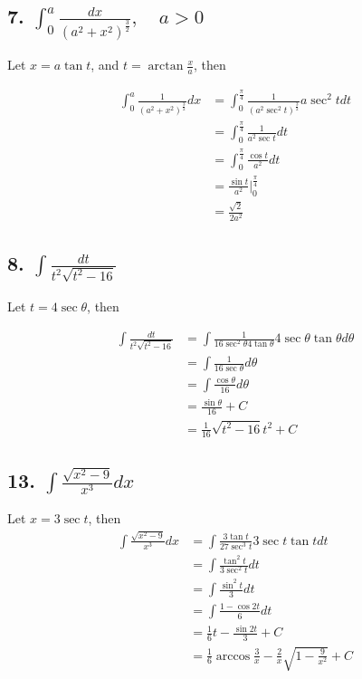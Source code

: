 \documentclass{article}
\begin{document}
    \subsection*{7. $\int_0^a \frac{dx}{(a^2 + x^2)^{\frac 3 2}}, \quad a > 0$}

    Let $x = a\tan t$, and $t = \arctan \frac x a$, then

    $$\begin{aligned}
        \int _0^a \frac{1}{(a^2 + x^2)^{\frac 3 2}}dx &= \int_0^{\frac \pi 4} \frac{1}{(a^2\sec^2 t)^{\frac 3 2}}a\sec^2 t dt \\
        &= \int_0^{\frac \pi 4} \frac{1}{a^2\sec t}dt \\
        &= \int_0^{\frac \pi 4} \frac{\cos t}{a^2}dt \\
        &= \frac{\sin t}{a^2} \biggl |_0^{\frac \pi 4} \\
        &= \frac{\sqrt 2}{2a^2}
    \end{aligned}$$

    \subsection*{8. $\int \frac{dt}{t^2\sqrt{t^2 - 16}}$}

    Let $t = 4\sec \theta$, then

    $$\begin{aligned}
        \int \frac{dt}{t^2\sqrt{t^2 - 16}} &= \int \frac{1}{16 \sec^2 \theta 4 \tan \theta} 4\sec \theta \tan \theta d\theta \\
        &= \int \frac{1}{16 \sec \theta} d\theta \\
        &= \int \frac{\cos \theta}{16} d\theta \\
        &= \frac{\sin \theta}{16} + C \\
        &= \frac{1}{16} \sqrt{t^2 - 16}{t^2} + C
    \end{aligned}$$

    \subsection*{13. $\int \frac{\sqrt{x^2 - 9}}{x^3} dx $}

    Let $x = 3\sec t$, then 
    $$\begin{aligned}
        \int \frac{\sqrt{x^2 - 9}}{x^3} dx &= \int \frac{3\tan t}{27\sec^3 t} 3 \sec t \tan t dt \\
        &= \int \frac{\tan ^2 t}{3\sec^2 t} dt \\
        &= \int \frac{\sin^2 t}{3} dt \\
        &= \int \frac{1 - \cos 2t}{6} dt \\
        &= \frac 1 6 t - \frac{\sin 2t}{3} + C \\
        &=  \frac 1 6 \arccos \frac 3 x - \frac{2}{x} \sqrt{1 - \frac{9}{x^2}} + C
    \end{aligned}$$
\end{document}
